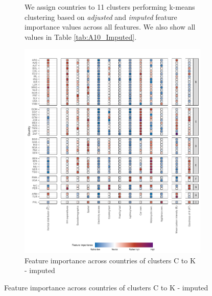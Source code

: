 \begin{figure}[ht!]
\begin{subfigure}[b]{\textwidth}
\begin{subcaption2}
    We assign countries to 11 clusters performing k-means clustering based on \textit{adjusted} and \textit{imputed} feature importance values across all features. We also show all values in Table \ref{tab:A10_Imputed}.
    \end{subcaption2}
    \end{subfigure}
    
\end{figure}
\clearpage

\clearpage
\begin{figure}[ht!]\ContinuedFloat
    \centering
    \begin{subfigure}[b]{\textwidth}
    \centering
    \includegraphics{Figure 4/Figure_4_Corrected_Imputed_2.pdf}
    \caption{Feature importance across countries of clusters C to K - imputed}\label{fig:fig_4_1_imputed}
    \begin{subcaption2}

\end{subcaption2}
\end{subfigure}
\end{figure}
